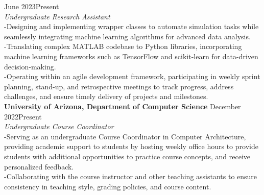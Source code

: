 \documentclass[10pt]{book}
\begin{document}
{{            \hfill June 2023\hspace{3pt}\textendash\hspace{3pt}Present
        }
        \\
        \textit{Undergraduate Research Assistant}
        \\
        \hspace{2pt}-\hspace{6pt}Designing and implementing wrapper classes to automate simulation tasks 
        while seamlessly integrating machine learning algorithms for advanced data analysis.
        \\
        \hspace{2pt}-\hspace{6pt}Translating complex MATLAB codebase to Python libraries, incorporating 
        machine learning frameworks such as TensorFlow and scikit-learn for data-driven decision-making.
        \\
        \hspace{2pt}-\hspace{6pt}Operating within an agile development framework, participating in weekly 
        sprint planning, stand-up, and retrospective meetings to track progress, address challenges, and 
        ensure timely delivery of projects and milestones.
        \\
        {
            \noindent\fontsize{11}{11}
            \selectfont\hspace{-3pt}\textbf{University of Arizona, Department of Computer Science \textendash}
            \hfill December 2022\hspace{3pt}\textendash\hspace{3pt}Present
        }
        \\
        \textit{Undergraduate Course Coordinator}
        \\
        \hspace{2pt}-\hspace{6pt}Serving as an undergraduate Course Coordinator in Computer Architecture, 
        providing academic support to students by hosting weekly office hours to provide students with 
        additional opportunities to practice course concepts, and receive personalized feedback.
        \\
        \hspace{2pt}-\hspace{6pt}Collaborating with the course instructor and other teaching assistants to 
        ensure consistency in teaching style, grading policies, and course content.
}
\end{document}
